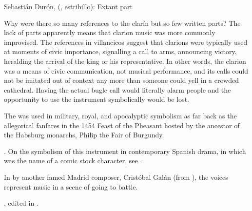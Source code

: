 {Sebastián Durón,  (, estribillo):
Extant  part}

Why were there so many references to the clarín but so few written parts?
The lack of parts apparently means that clarion music was more commonly
improvised.  
The references in villancicos suggest that clarions were typically used at
moments of civic importance, signalling a call to arms, announcing victory,
heralding the arrival of the king or his representative.
In other words, the clarion was a means of civic communication, not musical
performance, and its calls could not be imitated out of context any more than
someone could yell  in a crowded cathedral.
Having the actual bugle call would literally alarm people and the
opportunity to use the instrument symbolically would be lost.

The  was used in military, royal, and apocalyptic symbolism as far
back as the allegorical  fanfares in the 1454 Feast of the
Pheasant hosted by the ancestor of the Habsburg monarchs, Philip the Fair of
Burgundy.%
\begin{Footnote}
    \Autocites
    [340--380]{LaMarche:Memoires}
    {Bloxam:JNV}
    {Perkins:Patronage15C}.
    On the symbolism of this instrument in contemporary Spanish drama, in which
     was the name of a comic stock character, see
    \autocite{Damjanovic:Clarin}.
\end{Footnote}
In  by another famed Madrid composer, Cristóbal
Galán (from ), the voices represent  music in a scene
of  going to battle.%
\begin{Footnote} 
    , 
    edited in \autocite[555--565]{CaberoPueyo:PhD}.
\end{Footnote}


